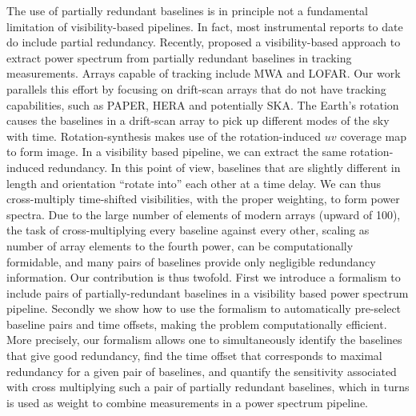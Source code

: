 \documentclass[twocolumn,apj,numberedappendix]{emulateapj}
\renewcommand\[{\begin{equation}}
\renewcommand\]{\end{equation}}
\begin{document}
The use of partially redundant baselines is in principle not a fundamental limitation of visibility-based pipelines. In fact, most instrumental reports to date do include partial redundancy. Recently, \cite{wterm} proposed a visibility-based approach to extract power spectrum from partially redundant baselines in tracking measurements. Arrays capable of tracking include MWA and LOFAR. Our work parallels this effort by focusing on drift-scan arrays that do not have tracking capabilities, such as PAPER, HERA and potentially SKA.
The Earth's rotation causes the baselines in a drift-scan array to pick up different modes of the sky with time. Rotation-synthesis makes use of the rotation-induced $uv$ coverage map to form image. In a visibility based pipeline, we can extract the same rotation-induced redundancy. In this point of view, baselines that are slightly different in length and orientation
``rotate into'' each other at a time delay. We can thus cross-multiply time-shifted visibilities, with the proper weighting, to form power spectra.  Due to the large number of elements of modern arrays (upward of 100), the task of cross-multiplying every baseline against every other, scaling as number of array elements to the fourth power, can be computationally formidable, and many pairs of baselines provide only negligible redundancy information. Our contribution is thus twofold. First we introduce a formalism to include pairs of partially-redundant baselines in a visibility based power spectrum pipeline. Secondly we show how to use the formalism to automatically pre-select baseline pairs and time offsets, making the problem computationally efficient. More precisely, our formalism allows one to simultaneously identify the baselines that give good
redundancy, find the time offset that corresponds to maximal redundancy for a given pair of baselines, and quantify the sensitivity associated with cross multiplying
such a pair of partially redundant baselines, which in turns is used as weight to combine measurements in a power spectrum pipeline. 

\end{document}
